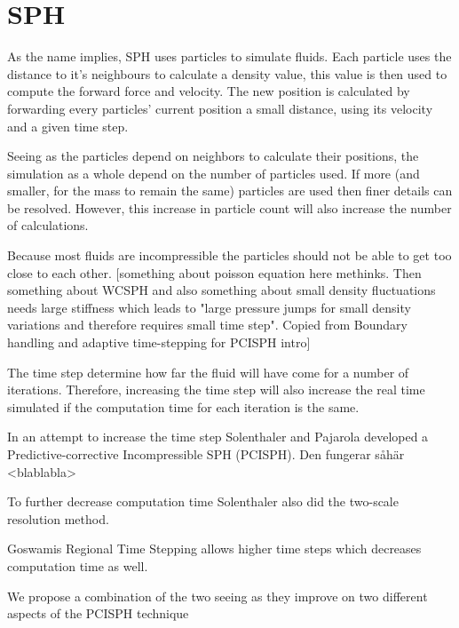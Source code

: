 \documentclass[../../main.tex]{subfiles}
\begin{document}
\section{SPH}
As the name implies, SPH uses particles to simulate fluids. Each particle uses the distance to it's neighbours to calculate a density value, this value is then used to compute the forward force and velocity. The new position is calculated by forwarding every particles' current position a small distance, using its velocity and a given time step. 

Seeing as the particles depend on neighbors to calculate their positions, the simulation as a whole depend on the number of particles used. If more (and smaller, for the mass to remain the same) particles are used then finer details can be resolved. However, this increase in particle count will also increase the number of calculations. 


Because most fluids are incompressible the particles should not be able to get too close to each other. [something about poisson equation here methinks. Then something about WCSPH and also something about small density fluctuations needs large stiffness which leads to "large pressure jumps for small density variations and therefore requires small time step". Copied from Boundary handling and adaptive time-stepping for PCISPH intro] 

The time step determine how far the fluid will have come for a number of iterations. Therefore, increasing the time step will also increase the real time simulated if the computation time for each iteration is the same. 

In an attempt to increase the time step Solenthaler and Pajarola developed a Predictive-corrective Incompressible SPH (PCISPH). Den fungerar såhär <blablabla>

To further decrease computation time Solenthaler also did the two-scale resolution method.

Goswamis Regional Time Stepping allows higher time steps which decreases computation time as well. 

We propose a combination of the two seeing as they improve on two different aspects of the PCISPH technique
\end{document}
